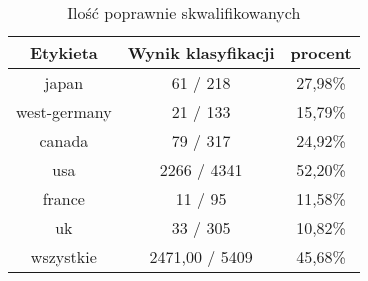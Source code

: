 \documentclass{classrep}
\begin{document}
\begin{table}[h]
\centering
\begin{tabular}{|c|c|c|}
\hline
Etykieta & Wynik klasyfikacji & procent\\
\hline
japan & 61 / 218 & 27,98\%\\
\hline
west-germany & 21 / 133 & 15,79\%\\
\hline
canada & 79 / 317 & 24,92\%\\
\hline
usa & 2266 / 4341 & 52,20\%\\
\hline
france & 11 / 95 & 11,58\%\\
\hline
uk & 33 / 305 & 10,82\%\\
\hline
wszystkie & 2471,00 / 5409 & 45,68\%\\
\hline
\end{tabular}
\caption{Ilość poprawnie skwalifikowanych}\end{table}
\end{document}
